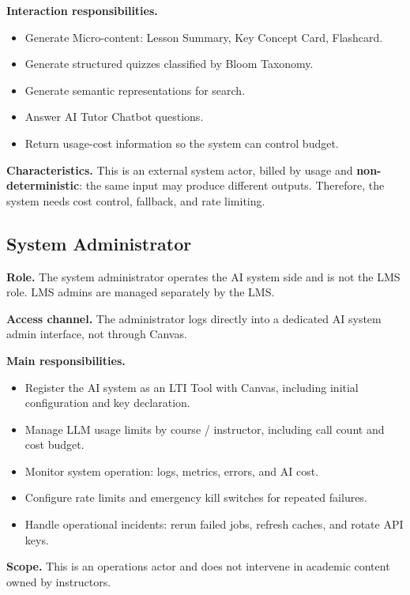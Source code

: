 \textbf{Interaction responsibilities.}

\begin{itemize}
    \item Generate Micro-content: Lesson Summary, Key Concept Card, Flashcard.
    \item Generate structured quizzes classified by Bloom Taxonomy.
    \item Generate semantic representations for search.
    \item Answer AI Tutor Chatbot questions.
    \item Return usage-cost information so the system can control budget.
\end{itemize}

\textbf{Characteristics.} This is an external system actor, billed by usage and
\textbf{non-deterministic}: the same input may produce different outputs.
Therefore, the system needs cost control, fallback, and rate limiting.

\subsection{System Administrator}

\textbf{Role.} The system administrator operates the AI system side and is not
the LMS role. LMS admins are managed separately by the LMS.

\textbf{Access channel.} The administrator logs directly into a dedicated AI
system admin interface, not through Canvas.

\textbf{Main responsibilities.}

\begin{itemize}
    \item Register the AI system as an LTI Tool with Canvas, including initial
          configuration and key declaration.
    \item Manage LLM usage limits by course / instructor, including call count
          and cost budget.
    \item Monitor system operation: logs, metrics, errors, and AI cost.
    \item Configure rate limits and emergency kill switches for repeated
          failures.
    \item Handle operational incidents: rerun failed jobs, refresh caches, and
          rotate API keys.
\end{itemize}

\textbf{Scope.} This is an operations actor and does not intervene in academic
content owned by instructors.

